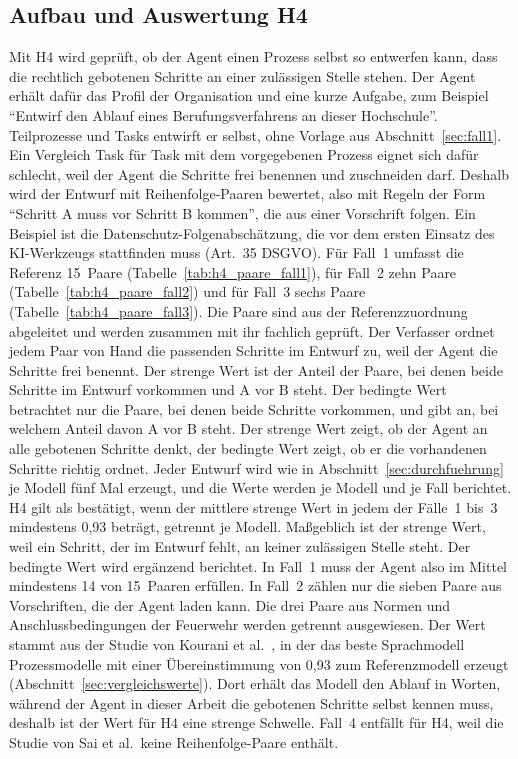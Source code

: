 \subsection{Aufbau und Auswertung H4}\label{sec:h4}
Mit H4 wird geprüft, ob der Agent einen Prozess selbst so entwerfen kann, dass die rechtlich gebotenen Schritte an einer zulässigen Stelle stehen.
Der Agent erhält dafür das Profil der Organisation und eine kurze Aufgabe, zum Beispiel \enquote{Entwirf den Ablauf eines Berufungsverfahrens an dieser Hochschule}.
Teilprozesse und Tasks entwirft er selbst, ohne Vorlage aus Abschnitt~\ref{sec:fall1}.
Ein Vergleich Task für Task mit dem vorgegebenen Prozess eignet sich dafür schlecht, weil der Agent die Schritte frei benennen und zuschneiden darf.
Deshalb wird der Entwurf mit Reihenfolge-Paaren bewertet, also mit Regeln der Form \enquote{Schritt A muss vor Schritt B kommen}, die aus einer Vorschrift folgen.
Ein Beispiel ist die Datenschutz-Folgenabschätzung, die vor dem ersten Einsatz des KI-Werkzeugs stattfinden muss (Art.~35 DSGVO).
Für Fall~1 umfasst die Referenz 15~Paare (Tabelle~\ref{tab:h4_paare_fall1}), für Fall~2 zehn Paare (Tabelle~\ref{tab:h4_paare_fall2}) und für Fall~3 sechs Paare (Tabelle~\ref{tab:h4_paare_fall3}).
Die Paare sind aus der Referenzzuordnung abgeleitet und werden zusammen mit ihr fachlich geprüft.
Der Verfasser ordnet jedem Paar von Hand die passenden Schritte im Entwurf zu, weil der Agent die Schritte frei benennt.
Der strenge Wert ist der Anteil der Paare, bei denen beide Schritte im Entwurf vorkommen und A vor B steht.
Der bedingte Wert betrachtet nur die Paare, bei denen beide Schritte vorkommen, und gibt an, bei welchem Anteil davon A vor B steht.
Der strenge Wert zeigt, ob der Agent an alle gebotenen Schritte denkt, der bedingte Wert zeigt, ob er die vorhandenen Schritte richtig ordnet.
Jeder Entwurf wird wie in Abschnitt~\ref{sec:durchfuehrung} je Modell fünf Mal erzeugt, und die Werte werden je Modell und je Fall berichtet.
H4 gilt als bestätigt, wenn der mittlere strenge Wert in jedem der Fälle~1 bis~3 mindestens 0,93 beträgt, getrennt je Modell.
Maßgeblich ist der strenge Wert, weil ein Schritt, der im Entwurf fehlt, an keiner zulässigen Stelle steht.
Der bedingte Wert wird ergänzend berichtet.
In Fall~1 muss der Agent also im Mittel mindestens 14 von 15~Paaren erfüllen.
In Fall~2 zählen nur die sieben Paare aus Vorschriften, die der Agent laden kann.
Die drei Paare aus Normen und Anschlussbedingungen der Feuerwehr werden getrennt ausgewiesen.
Der Wert stammt aus der Studie von Kourani et al.~\cite{kourani2024}, in der das beste Sprachmodell Prozessmodelle mit einer Übereinstimmung von 0,93 zum Referenzmodell erzeugt (Abschnitt~\ref{sec:vergleichswerte}).
Dort erhält das Modell den Ablauf in Worten, während der Agent in dieser Arbeit die gebotenen Schritte selbst kennen muss, deshalb ist der Wert für H4 eine strenge Schwelle.
Fall~4 entfällt für H4, weil die Studie von Sai et al.\ keine Reihenfolge-Paare enthält.


